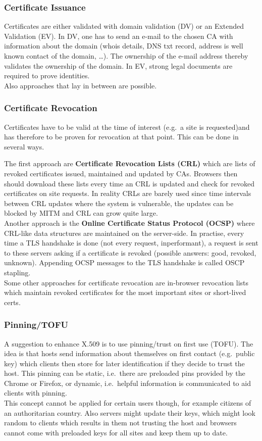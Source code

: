 \subsubsection{Certificate Issuance}
Certificates are either validated with domain validation (DV) or an Extended Validation (EV).
In DV, one has to send an e-mail to the chosen CA with information about the domain (whois details, DNS txt record, address is well known contact of the domain, \dots).
The ownership of the e-mail address thereby validates the ownership of the domain.
In EV, strong legal documents are required to prove identities.\\
Also approaches that lay in between are possible.

\subsubsection{Certificate Revocation}
Certificates have to be valid at the time of interest (e.g.\ a site is requested)and has therefore to be proven for revocation at that point.
This can be done in several ways.

The first approach are \textbf{Certificate Revocation Lists (CRL)} which are lists of revoked certificates issued, maintained and updated by CAs.
Browsers then should download these lists every time an CRL is updated and check for revoked certificates on site requests.
In reality CRLs are barely used since time intervals between CRL updates where the system is vulnerable, the updates can be blocked by MITM and CRL can grow quite large.\\

Another approach is the \textbf{Online Certificate Status Protocol (OCSP)} where CRL-like data structures are maintained on the server-side.
In practise, every time a TLS handshake is done (not every request, inperformant), a request is sent to these servers asking if a certificate is revoked (possible answers: good, revoked, unknown).
Appending OCSP messages to the TLS handshake is called OSCP stapling.\\

Some other approaches for certificate revocation are in-browser revocation lists which maintain revoked certificates for the most important sites or short-lived certs.

\subsubsection{Pinning/TOFU}
A suggestion to enhance X.509 is to use pinning/trust on first use (TOFU).
The idea is that hosts send information about themselves on first contact (e.g.\ public key) which clients then store for later identification if they decide to trust the host.
This pinning can be static, i.e.\ there are preloaded pins provided by the Chrome or Firefox, or dynamic, i.e.\ helpful information is communicated to aid clients with pinning.\\
This concept cannot be applied for certain users though, for example citizens of an authoritarian country.
Also servers might update their keys, which might look random to clients which results in them not trusting the host and browsers cannot come with preloaded keys for all sites and keep them up to date.

